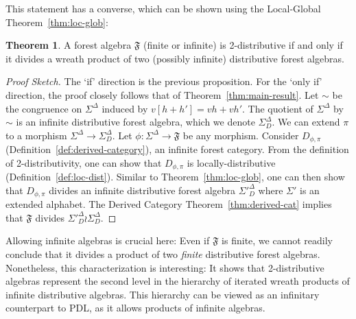 \documentclass[sigplan,9pt]{acmart}\settopmatter{printfolios=true,printccs=false,printacmref=false}
\newcounter{thm}
\newcounter{theorem}
\theoremstyle{definition}
\newtheorem{theorem}[thm]{Theorem}
\newcommand{\Ff}[0]{{\mathfrak{F}}}
\newcommand{\freedisth}[0]{{H_\Sigma^D}}
\begin{document}
This statement has a converse, which can be shown using the Local-Global Theorem~\ref{thm:loc-glob}:

\begin{theorem}\label{prop:2-wreath}
A forest algebra $\Ff$ (finite or infinite) is 2-distributive if and only if it divides a wreath product of two (possibly infinite) distributive forest algebras.
\end{theorem}

\begin{proof}[Proof Sketch]
The `if' direction is the previous proposition.
For the `only if' direction, the proof closely follows that of Theorem~\ref{thm:main-result}.
Let $\sim$ be the congruence on $\Sigma^\Delta$ induced by $v[h+h'] = vh+vh'$.
The quotient of $\Sigma^\Delta$ by $\sim$ is an infinite distributive forest algebra, which we denote $\Sigma^\Delta_D$. %
We can extend $\pi$ to a morphism $\Sigma^\Delta \rightarrow \Sigma^\Delta_D$. %
Let $\phi : \Sigma^\Delta \rightarrow \Ff$ be any morphism.
Consider $D_{\phi, \pi}$ (Definition~\ref{def:derived-category}), an infinite forest category.
From the definition of 2-distributivity, one can show that $D_{\phi, \pi}$ is locally-distributive (Definition~\ref{def:loc-dist}).
Similar to Theorem~\ref{thm:loc-glob}, one can then show that $D_{\phi, \pi}$ divides an infinite distributive forest algebra $\Sigma'^\Delta_D$ where $\Sigma'$ is an extended alphabet.
The Derived Category Theorem~\ref{thm:derived-cat} implies that $\Ff$ divides $\Sigma'^\Delta_D \wr \Sigma^\Delta_D$.

\end{proof}


Allowing infinite algebras is crucial here:
Even if $\Ff$ is finite, we cannot readily conclude that it divides a product of two \emph{finite} distributive forest algebras.
Nonetheless, this characterization is interesting:
It shows that 2-distributive algebras represent the second level in the hierarchy of iterated wreath products of infinite distributive algebras.
This hierarchy can be viewed as an infinitary counterpart to PDL, as it allows products of infinite algebras.
\end{document}
